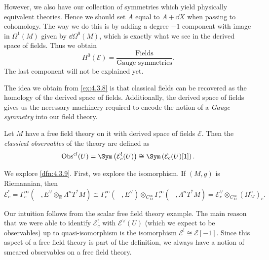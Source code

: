 \begin{example}
	However, we also have our collection of symmetries which yield physically equivalent theories. Hence we should set $A$ equal to $A+\dd X$ when passing to cohomology. The way we do this is by adding a degree $-1$ component with image in $\Omega ^1(M)$ given by $\dd \Omega ^0(M)$, which is exactly what we see in the derived space of fields. Thus we obtain
	\[
		H^0(\mathcal{E} )=\frac{\text{Fields} }{\text{Gauge symmetries} } 
	.\]
	The last component will not be explained yet.
\end{example}

The idea we obtain from \cref{ex:4.3.8} is that classical fields can be recovered as the homology of the derived space of fields. Additionally, the derived space of fields gives us the necessary machinery required to encode the notion of a \emph{Gauge symmetry} into our field theory.

\begin{definition}\label{dfn:4.3.9}
	Let $M$ have a free field theory on it with derived space of fields $\mathcal{E} $. Then the \emph{classical observables} of the theory are defined as
	\[
		\Obs^{cl} (U) = \Sym \left( \mathcal{E} _c^!(U) \right) \cong \Sym \left( \mathcal{E} _c(U)[1] \right) 
	.\]
\end{definition}

We explore \cref{dfn:4.3.9}. First, we explore the isomorphism. If $(M,g)$ is Riemannian, then
	\[
		\mathcal{E} ^!_c = \Gamma ^\infty _c(-,E^\vee \otimes_\mathbb{R} \Lambda ^nT^*M) \cong \Gamma ^\infty _c(-,E^\vee )\otimes_{C^\infty _M} \Gamma ^\infty _c(-,\Lambda ^nT^*M) = \mathcal{E} ^\vee _c \otimes _{C^\infty _M} (\Omega ^n_M)_c
	.\]
	
Our intuition follows from the scalar free field theory example. The main reason that we were able to identify $\mathcal{E} _c^!$ with $\mathcal{E} ^\vee (U)$ (which we expect to be observables) up to quasi-isomorphism is the isomorphism $\mathcal{E} ^! \cong \mathcal{E} [-1]$. Since this aspect of a free field theory is part of the definition, we always have a notion of smeared observables on a free field theory.


